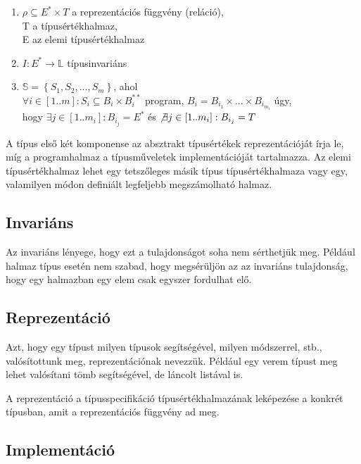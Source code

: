 \documentclass[margin=0px]{article}
\begin{document}
	\begin{enumerate}
		\item $\rho \subseteq E^{*} \times T$ a reprezentációs függvény (reláció),\\
		T a típusértékhalmaz,\\
		E az elemi típusértékhalmaz
		\item $I : E^{*} \to \mathbb{L} $ típusinvariáns
		\item $\mathbb{S} = \left\{ {S_{1},S_{2},...,S_{m}}\right\}$, ahol\\
		$\forall i \in [1..m]: S_{i} \subseteq B_{i} \times B_{i}^{**}$ program, $B_{i} = B_{i_{1}} \times ... \times B_{i_{m_{i}}}$ úgy,\\
		hogy $\exists j \in [1..m_{i}]: B_{i_{j}} = E^{*}$ és $\not \exists j \in [1..m_{i}]: B_{i_{j}} = T$
	\end{enumerate}
	
	A típus első két komponense az absztrakt típusértékek reprezentációját írja le, míg a programhalmaz a típusműveletek implementációját tartalmazza. Az elemi típusértékhalmaz lehet egy tetszőleges másik típus típusértékhalmaza vagy egy, valamilyen módon definiált legfeljebb megszámolható halmaz.
	
	\subsection{Invariáns}
	
	Az invariáns lényege, hogy ezt a tulajdonságot soha nem sérthetjük meg. Például halmaz típus esetén nem szabad, hogy megsérüljön
	az az invariáns tulajdonság, hogy egy halmazban egy elem csak egyszer fordulhat elő.
	
	\subsection{Reprezentáció}
	
	Azt, hogy egy típust milyen típusok segítségével, milyen módszerrel, stb., valósítottunk meg, reprezentációnak nevezzük. Például
	egy verem típust meg lehet valósítani tömb segítségével, de láncolt listával is.
	
	A reprezentáció a típusspecifikáció típusértékhalmazának leképezése a konkrét típusban, amit a reprezentációs függvény ad meg.
	
	\subsection{Implementáció}
	
\end{document}
